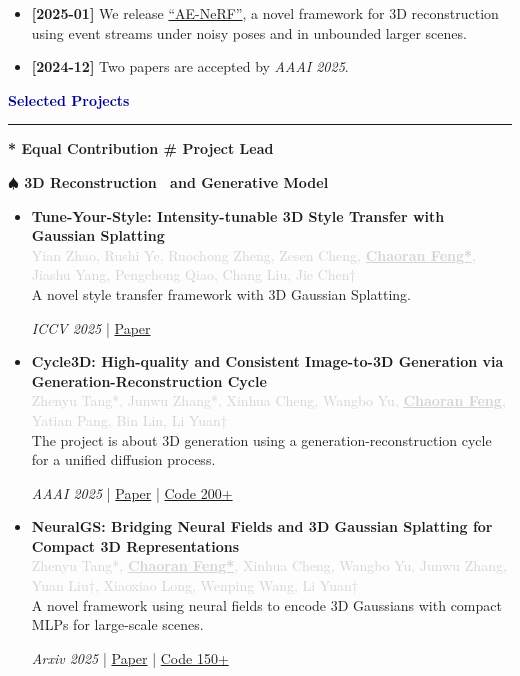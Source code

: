 \documentclass[11pt, a4paper]{article}
\newcommand{\sectioncolor}[1]{\textcolor{darkblue}{#1}}
\newcommand{\secondarycolor}[1]{\textcolor{lightgray}{#1}}
\newcommand{\cvsection}[1]{
    \vspace{10pt}
    {\Large\bfseries\sectioncolor{#1}}
    \vspace{2pt}
    \hrule height 1pt
    \vspace{8pt}
}
\newenvironment{projectentry}[3]{
    \vspace{8pt}
    \textbf{#1} \\
    \secondarycolor{#2} \\
    #3
    \vspace{6pt}
}{}
\begin{document}
\begin{minipage}[t]{0.7\textwidth}
\begin{itemize}[leftmargin=0pt, itemsep=4pt]
    \item \textbf{[2025-01]}  We release \href{https://arxiv.org/pdf/2501.02807}{``AE-NeRF''}, a novel framework for 3D reconstruction using event streams under noisy poses and in unbounded larger scenes.
    
    \item \textbf{[2024-12]} Two papers are accepted by \textit{AAAI 2025}.
\end{itemize}

\cvsection{Selected Projects}

\textbf{* Equal Contribution \quad \# Project Lead}

\vspace{8pt}

{\color{darkblue}\textbf{$\spadesuit$ 3D Reconstruction \ and Generative Model}}

\begin{itemize}[leftmargin=0pt, itemsep=8pt]
    \item \begin{projectentry}
        { Tune-Your-Style: Intensity-tunable 3D Style Transfer with Gaussian Splatting}
        {Yian Zhao, Rushi Ye, Ruochong Zheng, Zesen Cheng, \textbf{\underline{Chaoran Feng*}}, Jiashu Yang, Pengchong Qiao, Chang Liu, Jie Chen†}
        {A novel style transfer framework with 3D Gaussian Splatting.}
        \end{projectentry}
        \textit{ICCV 2025} | \href{https://iccv.thecvf.com/virtual/2025/poster/2554}{Paper}
        
    \item \begin{projectentry}
        { Cycle3D: High-quality and Consistent Image-to-3D Generation via Generation-Reconstruction Cycle}
        {Zhenyu Tang*, Junwu Zhang*, Xinhua Cheng, Wangbo Yu, \textbf{\underline{Chaoran Feng}}, Yatian Pang, Bin Lin, Li Yuan†}
        {The project is about 3D generation using a generation-reconstruction cycle for a unified diffusion process.}
        \end{projectentry}
        \textit{AAAI 2025} | \href{https://arxiv.org/pdf/2407.19548}{Paper} | \href{https://github.com/PKU-YuanGroup/Cycle3D}{Code 200+}
        
    \item \begin{projectentry}
        { NeuralGS: Bridging Neural Fields and 3D Gaussian Splatting for Compact 3D Representations}
        {Zhenyu Tang*, \textbf{\underline{Chaoran Feng*}}, Xinhua Cheng, Wangbo Yu, Junwu Zhang, Yuan Liu†, Xiaoxiao Long, Wenping Wang, Li Yuan†}
        {A novel framework using neural fields to encode 3D Gaussians with compact MLPs for large-scale scenes.}
        \end{projectentry}
        \textit{Arxiv 2025} | \href{https://arxiv.org/pdf/2503.23162}{Paper} | \href{https://github.com/PKU-YuanGroup/NeuralGS}{Code 150+}
\end{itemize}


\end{minipage}
\end{document}
